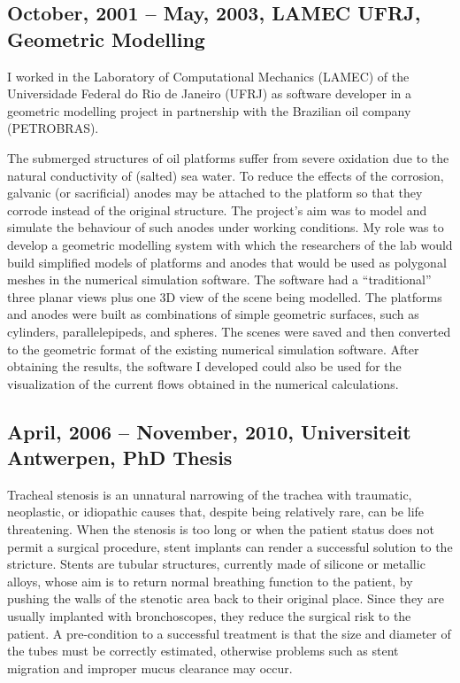 \documentclass[a4paper]{article}
\begin{document}
\subsection{October, 2001 -- May, 2003, LAMEC UFRJ, Geometric Modelling}

I worked in the Laboratory of Computational Mechanics (LAMEC) of the Universidade Federal do Rio de Janeiro (UFRJ) as software developer in a geometric modelling project in partnership with the Brazilian oil company (PETROBRAS). 

The submerged structures of oil platforms suffer from severe oxidation due to the natural conductivity of (salted) sea water. To reduce the effects of the corrosion, galvanic (or sacrificial) anodes may be attached to the platform so that they corrode instead of the original structure. The project's aim was to model and simulate the behaviour of such anodes under working conditions. My role was to develop a geometric modelling system with which the researchers of the lab would build simplified models of platforms and anodes that would be used as polygonal meshes in the numerical simulation software. The software had a ``traditional'' three planar views plus one 3D view of the scene being modelled. The platforms and anodes were built as combinations of simple geometric surfaces, such as cylinders, parallelepipeds, and spheres. The scenes were saved and then converted to the geometric format of the existing numerical simulation software. After obtaining the results, the software I developed could also be used for the visualization of the current flows obtained in the numerical calculations. 

\subsection{April, 2006 -- November, 2010, Universiteit Antwerpen, PhD Thesis}

Tracheal stenosis is an unnatural narrowing of the trachea with traumatic, neoplastic, or idiopathic causes that, despite being relatively rare, can be life threatening. When the stenosis is too long or when the patient status does not permit a surgical procedure, stent implants can render a successful solution to the stricture. Stents are tubular structures, currently made of silicone or metallic alloys, whose aim is to return normal breathing function to the patient, by pushing the walls of the stenotic area back to their original place. Since they are usually implanted with bronchoscopes, they reduce the surgical risk to the patient. A pre-condition to a successful treatment is that the size and diameter of the tubes must be correctly estimated, otherwise problems such as stent migration and improper mucus clearance may occur.
\end{document}
